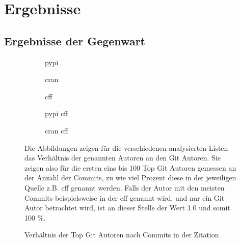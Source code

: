 \chapter{Ergebnisse}
\label{chap:ergebnisse}
\section{Ergebnisse der Gegenwart}
\label{sec:neuste_ergebnisse}
\begin{figure}
    \begin{subfigure}{.5\textwidth}
        \centering
        
        \caption{\gls{pypi}}
        \label{fig:common_authors_pypi}
    \end{subfigure}%
    \begin{subfigure}{.5\textwidth}
        \centering
        
        \caption{\gls{cran}}
        \label{fig:common_authors_cran}
    \end{subfigure}
    \begin{subfigure}{.5\textwidth}
        \centering
        
        \caption{\gls{cff}}
        \label{fig:common_authors_cff}
    \end{subfigure}%
    \begin{subfigure}{.5\textwidth}
        \centering
        
        \caption{\gls{pypi} \gls{cff}}
        \label{fig:common_authors_pypi_cff}
    \end{subfigure}
    \centering
    \begin{subfigure}{.5\textwidth}
        \centering
        
        \caption{\gls{cran} \gls{cff}}
        \label{fig:common_authors_cran_cff}
    \end{subfigure}
    \caption{Verhältnis der Top Git Autoren nach Commits in der Zitation}
    \label{fig:common_authors}
    \small
    Die Abbildungen zeigen für die verschiedenen analysierten Listen das Verhältnis der genannten Autoren an den Git Autoren. Sie zeigen also für die ersten eins bis 100 Top Git Autoren gemessen an der Anzahl der Commits, zu wie viel Prozent diese in der jeweiligen Quelle z.B. \gls{cff} genannt werden. Falls der Autor mit den meisten Commits beispielsweise in der \gls{cff} genannt wird, und nur ein Git Autor betrachtet wird, ist an dieser Stelle der Wert 1.0 und somit 100 \%.
\end{figure}

